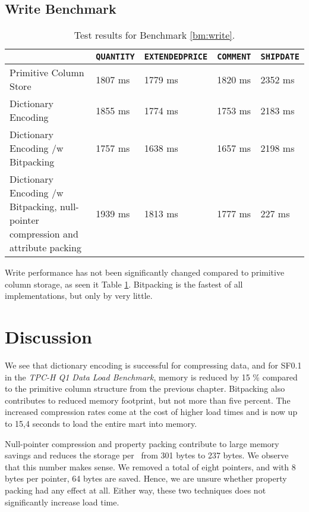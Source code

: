 \subsection{Write Benchmark}
\label{sub:compression-write-benchmark}
\begin{table}
    \begin{tabularx}{\textwidth}{X | X X X X}
         & \texttt{QUANTITY} & \texttt{EXTENDEDPRICE} & \texttt{COMMENT} & \texttt{SHIPDATE}\\ 
        \hline
        \hline
        Primitive Column Store & 1807 ms & 1779 ms & 1820 ms & 2352 ms \\
        Dictionary Encoding & 1855 ms & 1774 ms & 1753 ms & 2183 ms \\
        Dictionary Encoding /w Bitpacking & 1757 ms & 1638 ms & 1657 ms & 2198 ms \\
        Dictionary Encoding /w Bitpacking, null-pointer compression and attribute packing & 1939 ms & 1813 ms & 1777 ms & 227 ms \\
    \end{tabularx}
    \caption{Test results for Benchmark \ref{bm:write}.}
    \label{tab:compression-write}
\end{table}
Write performance has not been significantly changed compared to primitive column storage, as seen it Table \ref{tab:compression-write}. Bitpacking is the fastest of all implementations, but only by very little.

\section{Discussion}
\label{sec:compression-discussion}
We see that dictionary encoding is successful for compressing data, and for SF0.1 in the \textit{TPC-H Q1 Data Load Benchmark}, memory is reduced by 15 \% compared to the primitive column structure from the previous chapter. Bitpacking also contributes to reduced memory footprint, but not more than five percent. The increased compression rates come at the cost of higher load times and is now up to 15,4 seconds to load the entire mart into memory.

Null-pointer compression and property packing contribute to large memory savings and reduces the storage per \lineitem~from 301 bytes to 237 bytes. We observe that this number makes sense. We removed a total of eight pointers, and with 8 bytes per pointer, 64 bytes are saved. Hence, we are unsure whether property packing had any effect at all.  Either way, these two techniques does not significantly increase load time.

